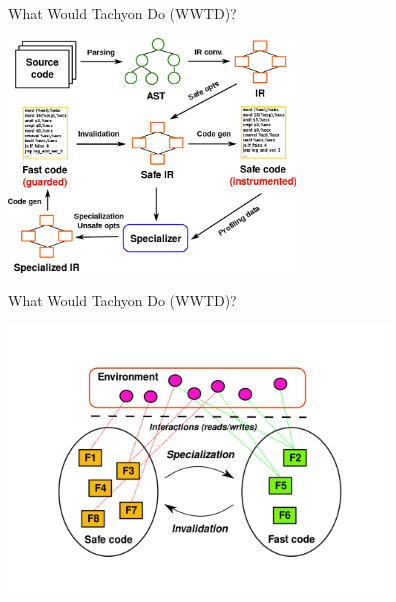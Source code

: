 \begin{frame}{What Would Tachyon Do (WWTD)?}
\begin{center}
\includegraphics[width=3in]{images/transforms2}
\end{center}
\end{frame}

\begin{frame}{What Would Tachyon Do (WWTD)?}
\begin{center}
\includegraphics[height=2.8in]{images/execmodel}
\end{center}
\end{frame}

